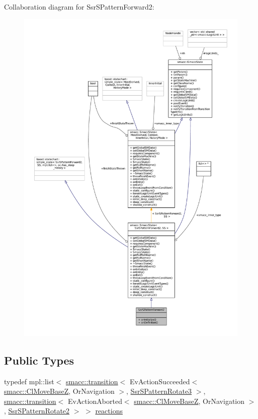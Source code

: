 Collaboration diagram for Ssr\+S\+Pattern\+Forward2\+:
\nopagebreak
\begin{figure}[H]
\begin{center}
\leavevmode
\includegraphics[width=350pt]{structSsrSPatternForward2__coll__graph}
\end{center}
\end{figure}
\subsection*{Public Types}
\begin{DoxyCompactItemize}
\item 
typedef mpl\+::list$<$ \hyperlink{classsmacc_1_1transition}{smacc\+::transition}$<$ Ev\+Action\+Succeeded$<$ \hyperlink{classsmacc_1_1ClMoveBaseZ}{smacc\+::\+Cl\+Move\+BaseZ}, Or\+Navigation $>$, \hyperlink{structSsrSPatternRotate3}{Ssr\+S\+Pattern\+Rotate3} $>$, \hyperlink{classsmacc_1_1transition}{smacc\+::transition}$<$ Ev\+Action\+Aborted$<$ \hyperlink{classsmacc_1_1ClMoveBaseZ}{smacc\+::\+Cl\+Move\+BaseZ}, Or\+Navigation $>$, \hyperlink{structSsrSPatternRotate2}{Ssr\+S\+Pattern\+Rotate2} $>$ $>$ \hyperlink{structSsrSPatternForward2_ae092c11ef4063d966b894e8a6cae33dd}{reactions}
\end{DoxyCompactItemize}

